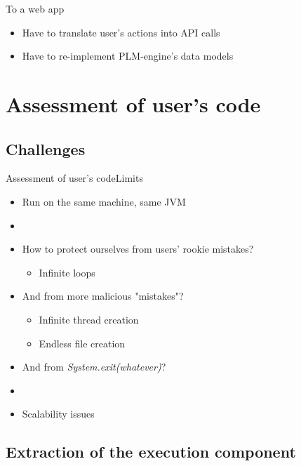 \documentclass{beamer}
\begin{document}
\begin{frame}{To a web app}{}
  \begin{itemize}
    \item Have to translate user's actions into API calls
    \item Have to re-implement PLM-engine's data models
  \end{itemize}
\end{frame}

\section{Assessment of user's code}

\subsection{Challenges}

\begin{frame}{Assessment of user's code}{Limits}
  \begin{itemize}
  \item {
    Run on the same machine, same JVM
    \pause
  }
  \item[~]
  \item {
    How to protect ourselves from users' rookie mistakes?
    \begin{itemize}
    \item {
      Infinite loops
    }
    \end{itemize}
    \pause
  }
  \item {
    And from more malicious "mistakes"?
    \begin{itemize}
    \item {
      Infinite thread creation
    }
    \item {
      Endless file creation
    }
    \end{itemize}
    \pause
  }
  \item {
    And from \emph{System.exit(whatever)}?
    \pause
  }
  \item[~]
  \item {
    Scalability issues
  }
  \end{itemize}
\end{frame}

\subsection{Extraction of the execution component}
\end{document}
